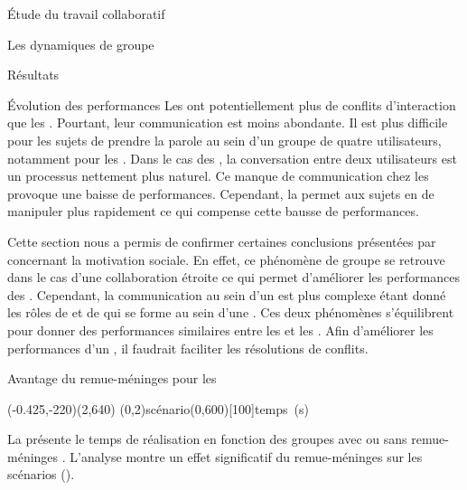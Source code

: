 \documentclass[myfrancais]{mythesis}
\begin{document}
\begin{mypart}{Étude du travail collaboratif}
\begin{mychapter}{Les dynamiques de groupe}
\begin{mysection}{Résultats}
\begin{mysubsection}{Évolution des performances}
					Les  ont potentiellement plus de conflits d'interaction que les .
					Pourtant, leur communication est moins abondante.
					Il est plus difficile pour les sujets de prendre la parole au sein d'un groupe de quatre utilisateurs, notamment pour les .
					Dans le cas des , la conversation entre deux utilisateurs est un processus nettement plus naturel.
					Ce manque de communication chez les  provoque une baisse de performances.
					Cependant, la  permet aux sujets en  de manipuler plus rapidement ce qui compense cette bausse de performances.

					Cette section nous a permis de confirmer certaines conclusions présentées par  concernant la motivation sociale.
					En effet, ce phénomène de groupe se retrouve dans le cas d'une collaboration étroite ce qui permet d'améliorer les performances des .
					Cependant, la communication au sein d'un  est plus complexe étant donné les rôles de  et de  qui se forme au sein d'une .
					Ces deux phénomènes s'équilibrent pour donner des performances similaires entre les  et les .
					Afin d'améliorer les performances d'un , il faudrait faciliter les résolutions de conflits.
				\end{mysubsection}
				\begin{mysubsection}{Avantage du remue-méninges pour les }
					\begin{myfigure}
						\begin{myps}(-0.425,-220)(2,640)
							\myaxes(0,2){scénario}(0,600)[100]{temps~(s)}
						\end{myps}
					\end{myfigure}

					La  présente le temps de réalisation  en fonction des groupes avec ou sans remue-méninges .
					L'analyse montre un effet significatif du remue-méninges  sur les scénarios  ().


\end{mysubsection}
\end{mysection}
\end{mychapter}
\end{mypart}
\end{document}
